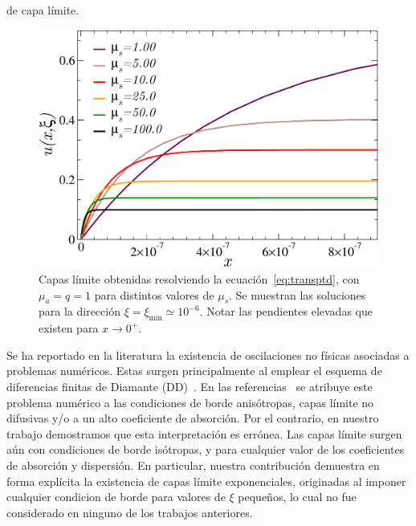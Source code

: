 de capa límite.
\begin{figure}[h!]
\centering
  \includegraphics[width=0.5\linewidth]{figuras/blayers.pdf}
  \caption{Capas límite obtenidas resolviendo la ecuación~\eqref{eq:transptd}, 
  con $\mu_a=q=1$ para distintos valores de $\mu_s$. 
  Se muestran las soluciones para la dirección $\xi=\xi_{\text{min}} \simeq 10^{-6}$. 
  Notar las pendientes elevadas que existen para $x\to 0^+$.}
 \label{fig:blayers}
\end{figure}
Se ha reportado en la literatura la existencia 
de oscilaciones no físicas 
asociadas a problemas numéricos. 
Estas surgen principalmente al emplear el esquema de 
diferencias finitas de Diamante (DD)~\cite{Larsen1987,Petrovic1996,Bal2001}.
En las referencias~\cite{Larsen1987,Petrovic1996} se atribuye 
este problema numérico a las condiciones de borde anisótropas, capas límite no difusivas y/o 
a un alto coeficiente de absorción. Por el contrario, 
en nuestro trabajo demostramos que esta interpretación es errónea. 
Las capas límite surgen aún con condiciones de borde isótropas, 
y para cualquier valor 
de los coeficientes de absorción y dispersión. En particular, 
nuestra contribución demuestra en forma explícita la existencia 
de capas límite exponenciales, originadas al imponer cualquier 
condicion de borde para valores de  $\xi$ 
pequeños, lo cual no fue considerado en ninguno de los trabajos anteriores.

